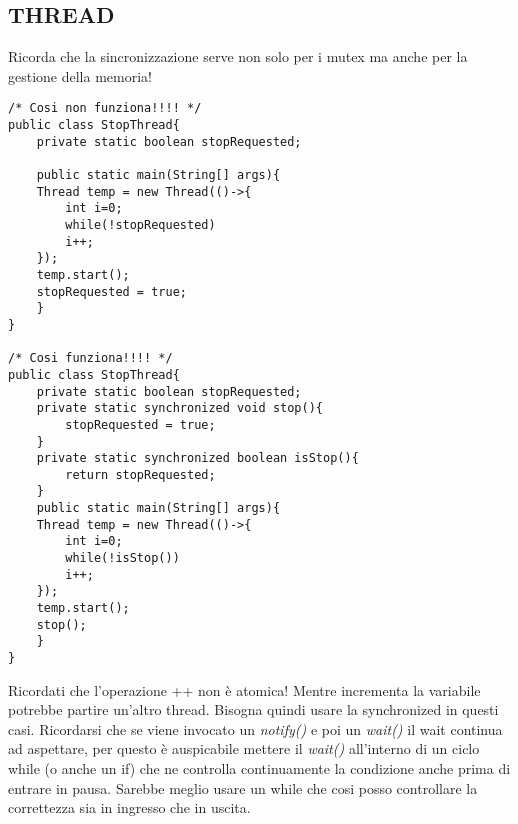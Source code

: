 \subsection{THREAD}
\noindent Ricorda che la sincronizzazione serve non solo per i mutex ma anche per la gestione della memoria!
\begin{lstlisting}
/* Cosi non funziona!!!! */
public class StopThread{
	private static boolean stopRequested;
	
	public static main(String[] args){
	Thread temp = new Thread(()->{
		int i=0;
		while(!stopRequested)
		i++;
	});
	temp.start();
	stopRequested = true;
	}
}

/* Cosi funziona!!!! */
public class StopThread{
	private static boolean stopRequested;
	private static synchronized void stop(){
		stopRequested = true;
	}
	private static synchronized boolean isStop(){
		return stopRequested;
	}	
	public static main(String[] args){
	Thread temp = new Thread(()->{
		int i=0;
		while(!isStop())
		i++;
	});
	temp.start();
	stop();
	}
}
\end{lstlisting}

\noindent Ricordati che l'operazione ++ non è atomica! Mentre incrementa la variabile potrebbe partire un'altro thread. Bisogna quindi usare la synchronized in questi casi. \newline
Ricordarsi che se viene invocato un \textit{notify()} e poi un \textit{wait()} il wait continua ad aspettare, per questo è auspicabile mettere il \textit{wait()} all'interno di un ciclo while (o anche un if) che ne controlla continuamente la condizione anche prima di entrare in pausa. Sarebbe meglio usare un while che cosi posso controllare la correttezza sia in ingresso che in uscita.